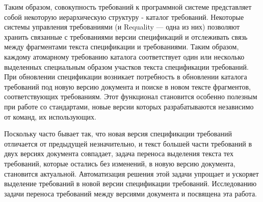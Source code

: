 Таким образом, совокупность требований к программной системе представляет собой некоторую иерархическую структуру - каталог требований. Некоторые системы управления требованиями (и Requality --- одна из них) позволяют хранить связанные с требованиями версии спецификаций и отслеживать связь между фрагментами текста спецификации и требованиями. Таким образом, каждому атомарному требованию каталога соответствует один или несколько выделенных специальным образом участков текста спецификации требований. При обновлении спецификации возникает потребность в обновлении каталога требований под новую версию документа и поиске в новом тексте фрагментов, соответствующих требованиям. Этот функционал становится особенно полезным при работе со стандартами, новые версии которых разрабатываются независимо от команд, их использующих.

Поскольку часто бывает так, что новая версия спецификации требований отличается от предыдущей незначительно, и текст большей части требований в двух версиях документа совпадает, задача переноса выделения текста тех требований, которые остались без изменений, в новую версию документа, становится актуальной. Автоматизация решения этой задачи упрощает и ускоряет выделение требований в новой версии спецификации требований. Исследованию задачи переноса требований между версиями документа и посвящена эта работа.

